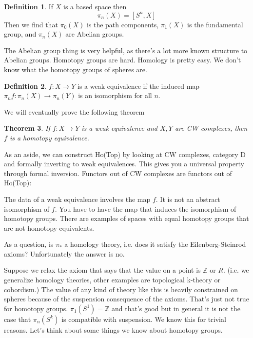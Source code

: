 \documentclass[10pt]{article}
\newtheorem{theorem}{Theorem}[section]
\theoremstyle{definition}
\newtheorem{definition}[theorem]{Definition}
\begin{document}
	\begin{definition}
		If $X$ is a based space then \[
		\pi_n(X)=[S^n,X]
		\]
		Then we find that $\pi_0(X)$ is the path components, $\pi_1(X)$ is the fundamental group, and $\pi_n(X)$ are Abelian groups. 
	\end{definition}
	The Abelian group thing is very helpful, as there's a lot more known structure to Abelian groups. Homotopy groups are hard. Homology is pretty easy. We don't know what the homotopy groups of spheres are. 
	\begin{definition}
		$f:X\to Y$ is a weak equivalence if the induced map $\pi_nf:\pi_n(X)\to \pi_n(Y)$ is an isomorphism for all $n$. 
	\end{definition}
	We will eventually prove the following theorem
	\begin{theorem}
		If $f:X\to Y$ is a weak equivalence and $X,Y$ are CW complexes, then $f$ is a homotopy equivalence. 
	\end{theorem}
	As an aside, we can construct \textsf{Ho(Top)} by looking at CW complexes, category \textsf{D} and formally inverting to weak equivalences. This gives you a universal property through formal inversion. Functors out of CW complexes are functors out of \textsf{Ho(Top)}:\begin{center}
	\end{center}
	The data of a weak equivalence involves the map $f$. It is not an abstract isomorphism of $f$. You have to have the map that induces the isomorphism of homotopy groups. There are examples of spaces with equal homotopy groups that are not homotopy equivalents. 
	
	As a question, is $\pi_*$ a homology theory, i.e. does it satisfy the Eilenberg-Steinrod axioms? Unfortunately the answer is no. 
	
	Suppose we relax the axiom that says that the value on a point is $\mathbb{Z}$ or $R$. (i.e. we generalize homology theories, other examples are topological k-theory or cobordism.) The value of any kind of theory like this is heavily constrained on spheres because of the suspension consequence of the axioms. That's just not true for homotopy groups. $\pi_1(S^1)=\mathbb{Z}$ and that's good but in general it is not the case that $\pi_n(S^k)$ is compatible with suspension. We know this for trivial reasons. Let's think about some things we know about homotopy groups. 
	
\end{document}
